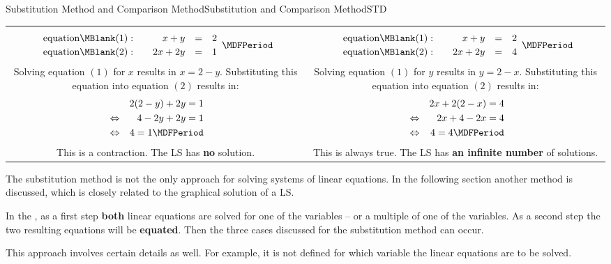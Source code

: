 \begin{MXContent}{Substitution Method and Comparison Method}{Substitution and Comparison Method}{STD}
\begin{MExample}
\begin{center}
\begin{tabular}{c|c}
\begin{minipage}[t]{7.5cm}
$$\begin{array}{rcrcl} \mbox{equation}\MBlank (1): & & x + y & = & 2 \\[.5ex]
\mbox{equation}\MBlank (2): & & 2 x + 2 y & = & 1 \end{array}\MDFPeriod $$
Solving equation $(1)$ for $x$ results in $x = 2 - y$.
Substituting this equation into equation $(2)$ results in:
\begin{eqnarray*}
& & 2 (2 - y) + 2y = 1 \\
& \Leftrightarrow & 4 - 2y + 2y = 1 \\
& \Leftrightarrow & 4 = 1\MDFPeriod 
\end{eqnarray*}
This is a contraction. The LS has \textbf{no} solution.
\end{minipage} &
\begin{minipage}[t]{7.5cm}
$$\begin{array}{rcrcl} \mbox{equation}\MBlank (1): & & x + y & = & 2 \\[.5ex]
\mbox{equation}\MBlank (2): & & 2 x + 2 y & = & 4 \end{array}\MDFPeriod $$
Solving equation $(1)$ for $y$ results in $y = 2 - x$.
Substituting this equation into equation $(2)$ results in:
\begin{eqnarray*}
& & 2x + 2 (2 - x) = 4 \\
& \Leftrightarrow & 2x + 4 - 2x = 4 \\
& \Leftrightarrow & 4 = 4\MDFPeriod 
\end{eqnarray*}
This is always true. The LS has \textbf{an infinite number} of solutions.
\end{minipage}
\end{tabular}
\end{center}
\end{MExample}
The substitution method is not the only approach for solving systems of linear 
equations. In the following section another method is discussed, which is closely related 
to the graphical solution of a LS.

\begin{MInfo}
In the  , as a first step \textbf{both} 
linear equations are solved for one of the variables -- or a multiple of one of 
the variables. As a second step the two resulting equations will be \textbf{equated}. 
Then the three cases discussed for the substitution method can occur. 
\end{MInfo}
This approach involves certain details as well. For example, it is not
defined for which variable the linear equations are to be solved.


\end{MXContent}
